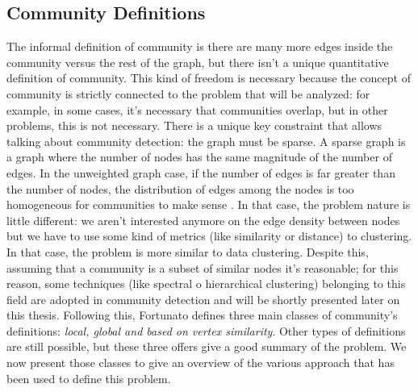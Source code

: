 \subsection{Community Definitions}\label{3.1}
The informal definition of community is there are many more edges inside the community versus the rest of the graph, but there isn't a unique quantitative definition of community. This kind of freedom is necessary because the concept of community is strictly connected to the problem that will be analyzed: for example, in some cases, it's necessary that communities overlap, but in other problems, this is not necessary. There is a unique key constraint that allows talking about community detection: the graph must be sparse. A sparse graph is a graph where the number of nodes has the same magnitude of the number of edges. In the unweighted graph case, if the number of edges is far greater than the number of nodes, the distribution of edges among the nodes is too homogeneous for communities to make sense \cite{fortunato}. In that case, the problem nature is little different: we aren't interested anymore on the edge density between nodes but we have to use some kind of metrics (like similarity or distance) to clustering. In that case, the problem is more similar to data clustering. Despite this, assuming that a community is a subset of similar nodes it's reasonable; for this reason, some techniques (like spectral o hierarchical clustering) belonging to this field are adopted in community detection and will be shortly presented later on this thesis.
Following this, Fortunato \cite{fortunato} defines three main classes of community's definitions: \textit{local, global and based on vertex similarity}. Other types of definitions are still possible, but these three offers give a good summary of the problem. We now present those classes to give an overview of the various approach that has been used to define this problem. 

